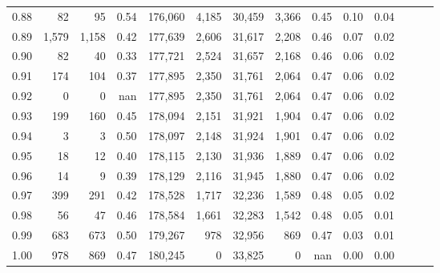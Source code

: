 \begin{tabular}{rrrrrrrrrrrrrr}
0.88 &      82 &     95 &  0.54 &  176,060 &    4,185 &  30,459 &   3,366 &  0.45 &  0.10 &      0.04 \\
0.89 &   1,579 &  1,158 &  0.42 &  177,639 &    2,606 &  31,617 &   2,208 &  0.46 &  0.07 &      0.02 \\
0.90 &      82 &     40 &  0.33 &  177,721 &    2,524 &  31,657 &   2,168 &  0.46 &  0.06 &      0.02 \\
0.91 &     174 &    104 &  0.37 &  177,895 &    2,350 &  31,761 &   2,064 &  0.47 &  0.06 &      0.02 \\
0.92 &       0 &      0 &   nan &  177,895 &    2,350 &  31,761 &   2,064 &  0.47 &  0.06 &      0.02 \\
0.93 &     199 &    160 &  0.45 &  178,094 &    2,151 &  31,921 &   1,904 &  0.47 &  0.06 &      0.02 \\
0.94 &       3 &      3 &  0.50 &  178,097 &    2,148 &  31,924 &   1,901 &  0.47 &  0.06 &      0.02 \\
0.95 &      18 &     12 &  0.40 &  178,115 &    2,130 &  31,936 &   1,889 &  0.47 &  0.06 &      0.02 \\
0.96 &      14 &      9 &  0.39 &  178,129 &    2,116 &  31,945 &   1,880 &  0.47 &  0.06 &      0.02 \\
0.97 &     399 &    291 &  0.42 &  178,528 &    1,717 &  32,236 &   1,589 &  0.48 &  0.05 &      0.02 \\
0.98 &      56 &     47 &  0.46 &  178,584 &    1,661 &  32,283 &   1,542 &  0.48 &  0.05 &      0.01 \\
0.99 &     683 &    673 &  0.50 &  179,267 &      978 &  32,956 &     869 &  0.47 &  0.03 &      0.01 \\
1.00 &     978 &    869 &  0.47 &  180,245 &        0 &  33,825 &       0 &   nan &  0.00 &      0.00 \\
\bottomrule
\end{tabular}
